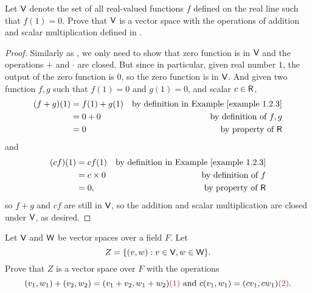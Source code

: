\begin{exercise} \label{exercise 1.2.20}
Let \(\textsf{V}\) denote the set of all real-valued functions \(f\) defined on the real line such that \(f(1) = 0\).
Prove that \(\textsf{V}\) is a vector space with the operations
of addition and scalar multiplication defined in .
\end{exercise}

\begin{proof}
Similarly as , we only need to show that zero function is in \(\textsf{V}\) and the operations \(+\) and \(\cdot\) are closed.
But since in particular, given real number \(1\), the output of the zero function is \(0\), so the zero function is in \(\textsf{V}\).
And given two function \(f, g\) such that \(f(1) = 0\) and \(g(1) = 0\), and scalar \(c \in \textsf{R}\),
\begin{align*}
    (f + g)(1) & = f(1) + g(1) & \text{by definition in \EXAMPLE{1.2.3}} \\
               & = 0 + 0 & \text{by definition of \(f, g\)} \\
               & = 0 & \text{by property of \(\SET{R}\)}
\end{align*}
and
\begin{align*}
    (cf)(1) & = cf(1) & \text{by definition in \EXAMPLE{1.2.3}} \\
            & = c \X 0 & \text{by definition of \(f\)} \\
            & = 0, & \text{by property of \(\SET{R}\)}
\end{align*}
so \(f + g\) and \(cf\) are still in \(\textsf{V}\), so the addition and scalar multiplication are closed under \(\textsf{V}\), as desired.
\end{proof}

\begin{exercise} \label{exercise 1.2.21}
Let \(\textsf{V}\) and \(\textsf{W}\) be vector spaces over a field \(F\).
Let
\[
    Z = \{ (v, w) : v \in \textsf{V}, w \in \textsf{W} \}.
\]
Prove that \(Z\) is a vector space over \(F\) with the operations
\[
    (v_1, w_1) + (v_2, w_2) = (v_1 + v_2, w_1 + w_2) \MAROON{(1)} \text{ and } c(v_1, w_1) = (c v_1, c w_1) \MAROON{(2)}.
\]
\end{exercise}

